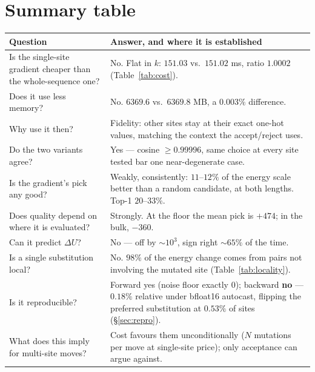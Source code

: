 \documentclass[11pt,a4paper]{article}
\begin{document}
\section{Summary table}

\begin{table}[htbp]
\centering
\small
\begin{tabular}{p{5.4cm} p{9.0cm}}
\toprule
Question & Answer, and where it is established \\
\midrule
Is the single-site gradient cheaper than the whole-sequence one?
  & No. Flat in $k$: $151.03$ vs.\ $151.02$ ms, ratio $1.0002$
    (Table~\ref{tab:cost}). \\
Does it use less memory?
  & No. $6369.6$ vs.\ $6369.8$ MB, a $0.003\%$ difference. \\
Why use it then?
  & Fidelity: other sites stay at their exact one-hot values, matching the
    context the accept/reject uses. \\
Do the two variants agree?
  & Yes --- cosine $\ge 0.99996$, same choice at every site tested bar one
    near-degenerate case. \\
Is the gradient's pick any good?
  & Weakly, consistently: $11$--$12\%$ of the energy scale better than a
    random candidate, at both lengths. Top-1 $20$--$33\%$. \\
Does quality depend on where it is evaluated?
  & Strongly. At the floor the mean pick is $+474$; in the bulk, $-360$. \\
Can it predict $\Delta U$?
  & No --- off by $\sim\!10^{3}$, sign right $\sim\!65\%$ of the time. \\
Is a single substitution local?
  & No. $98\%$ of the energy change comes from pairs not involving the
    mutated site (Table~\ref{tab:locality}). \\
Is it reproducible?
  & Forward yes (noise floor exactly 0); backward \textbf{no} --- $0.18\%$
    relative under bfloat16 autocast, flipping the preferred substitution at
    $0.53\%$ of sites (\S\ref{sec:repro}). \\
What does this imply for multi-site moves?
  & Cost favours them unconditionally ($N$ mutations per move at
    single-site price); only acceptance can argue against. \\
\bottomrule
\end{tabular}
\end{table}
\end{document}

